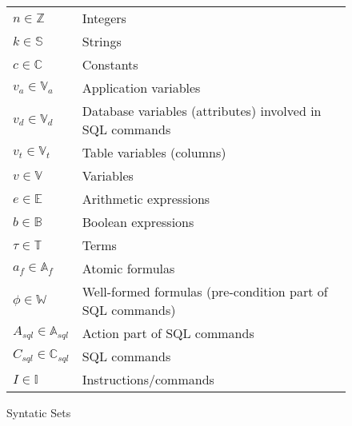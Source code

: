 \begin{figure}[htb!]
     \center
    \begin{tabular}{l l}
    $n \in \mathbb{Z}$                          & Integers                                                   \\
    $k \in \mathbb{S}$                                  & Strings                                                    \\
    $c \in \mathbb{C}$                          & Constants                                                 \\
    $v_a \in \mathbb{V}_a$                      & Application variables                                     \\
    $v_d \in \mathbb{V}_d$                      & Database variables (attributes) involved in SQL commands  \\
    $v_t \in \mathbb{V}_t$                    & Table variables (columns)    \\
    $v \in \mathbb{V}$ & Variables                                                 \\
    $e \in \mathbb{E}$                          & Arithmetic expressions                                    \\
    $b \in \mathbb{B}$                          & Boolean expressions                                       \\
    $\tau \in \mathbb{T}$                       & Terms                                                     \\
    $a_f \in \mathbb{A}_f$                      & Atomic formulas                                           \\
    $\phi  \in \mathbb{W}$                      & Well-formed formulas (pre-condition part of SQL commands) \\
    $A_{sql} \in \mathbb{A}_{sql}$              & Action part of SQL commands                               \\
    $C_{sql} \in \mathbb{C}_{sql}$              & SQL commands                                              \\
    $I \in \mathbb{I}$                          & Instructions/commands                                     \\
    \end{tabular}
    \caption{Syntatic Sets}
    \label{tab:syntatic-sets}
\end{figure}


